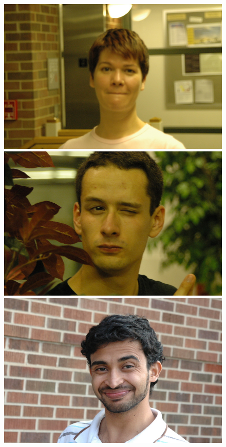 \begin{figure}
\includegraphics[scale=0.35,clip=true]{figures_cvpr/examples/4/success/DSC_1922.jpg} 
\includegraphics[scale=0.35,clip=true]{figures_cvpr/examples/4/success/DSC_2000.jpg} \\
\includegraphics[scale=0.35,clip=true]{figures_cvpr/examples/4/failure/DSC_1568.jpg} 

\end{figure}
